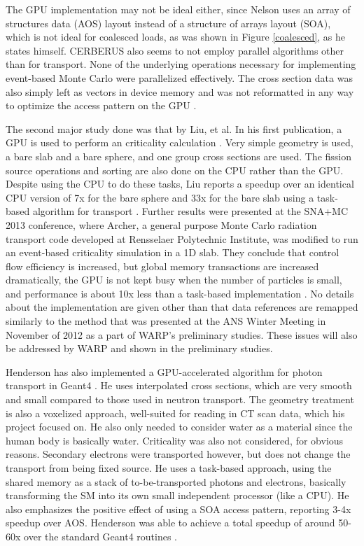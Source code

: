 The GPU implementation may not be ideal either, since Nelson uses an array of structures data (AOS) layout instead of a structure of arrays layout (SOA), which is not ideal for coalesced loads, as was shown in Figure \ref{coalesced}, as he states himself.  CERBERUS also seems to not employ parallel algorithms other than for transport.  None of the underlying operations necessary for implementing event-based Monte Carlo were parallelized effectively.  The cross section data was also simply left as vectors in device memory and was not reformatted in any way to optimize the access pattern on the GPU \cite{nelson}.

The second major study done was that by Liu, et al.  In his first publication, a GPU is used to perform an criticality calculation \cite{tianyu}.  Very simple geometry is used, a bare slab and a bare sphere, and one group cross sections are used.  The fission source operations and sorting are also done on the CPU rather than the GPU.  Despite using the CPU to do these tasks, Liu reports a speedup over an identical CPU version of 7x for the bare sphere and 33x for the bare slab using a task-based algorithm for transport \cite{tianyu}.  Further results were presented at the SNA+MC 2013 conference, where Archer, a general purpose Monte Carlo radiation transport code developed at Rensselaer Polytechnic Institute, was modified to run an event-based criticality simulation in a 1D slab.  They conclude that control flow efficiency is increased, but global memory transactions are increased dramatically, the GPU is not kept busy when the number of particles is small, and performance is about 10x less than a task-based implementation \cite{tianyu_snamc}.  No details about the implementation are given other than that data references are remapped similarly to the method that was presented at the ANS Winter Meeting in November of 2012 as a part of WARP's preliminary studies.  These issues will also be addressed by WARP and shown in the preliminary studies.

Henderson has also implemented a GPU-accelerated algorithm for photon transport in Geant4 \cite{henderson}.   He uses interpolated cross sections, which are very smooth and small compared to those used in neutron transport.  The geometry treatment is also a voxelized approach, well-suited for reading in CT scan data, which his project focused on.  He also only needed to consider water as a material since the human body is basically water.  Criticality was also not considered, for obvious reasons. Secondary electrons were transported however, but does not change the transport from being fixed source. He uses a task-based approach, using the shared memory as a stack of to-be-transported photons and electrons, basically transforming the SM into its own small independent processor (like a CPU).  He also emphasizes the positive effect of using a SOA access pattern, reporting 3-4x speedup over AOS.  Henderson was able to achieve a total speedup of around 50-60x over the standard Geant4 routines \cite{henderson}.

